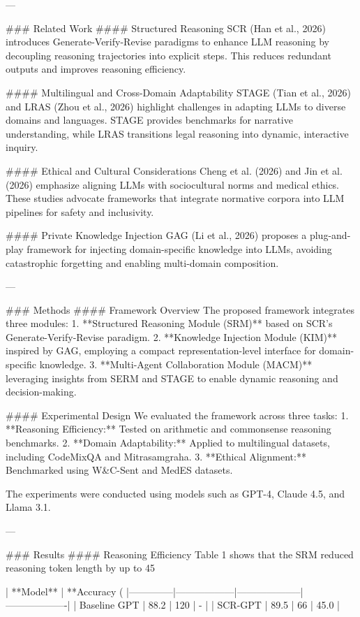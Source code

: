 ---

### Related Work  
#### Structured Reasoning  
SCR (Han et al., 2026) introduces Generate-Verify-Revise paradigms to enhance LLM reasoning by decoupling reasoning trajectories into explicit steps. This reduces redundant outputs and improves reasoning efficiency.

#### Multilingual and Cross-Domain Adaptability  
STAGE (Tian et al., 2026) and LRAS (Zhou et al., 2026) highlight challenges in adapting LLMs to diverse domains and languages. STAGE provides benchmarks for narrative understanding, while LRAS transitions legal reasoning into dynamic, interactive inquiry.

#### Ethical and Cultural Considerations  
Cheng et al. (2026) and Jin et al. (2026) emphasize aligning LLMs with sociocultural norms and medical ethics. These studies advocate frameworks that integrate normative corpora into LLM pipelines for safety and inclusivity.

#### Private Knowledge Injection  
GAG (Li et al., 2026) proposes a plug-and-play framework for injecting domain-specific knowledge into LLMs, avoiding catastrophic forgetting and enabling multi-domain composition.

---

### Methods  
#### Framework Overview  
The proposed framework integrates three modules:  
1. **Structured Reasoning Module (SRM)** based on SCR's Generate-Verify-Revise paradigm.  
2. **Knowledge Injection Module (KIM)** inspired by GAG, employing a compact representation-level interface for domain-specific knowledge.  
3. **Multi-Agent Collaboration Module (MACM)** leveraging insights from SERM and STAGE to enable dynamic reasoning and decision-making.

#### Experimental Design  
We evaluated the framework across three tasks:  
1. **Reasoning Efficiency:** Tested on arithmetic and commonsense reasoning benchmarks.  
2. **Domain Adaptability:** Applied to multilingual datasets, including CodeMixQA and Mitrasamgraha.  
3. **Ethical Alignment:** Benchmarked using W&C-Sent and MedES datasets.

The experiments were conducted using models such as GPT-4, Claude 4.5, and Llama 3.1.

---

### Results  
#### Reasoning Efficiency  
Table 1 shows that the SRM reduced reasoning token length by up to 45%

| **Model**    | **Accuracy (%
|--------------|------------------|--------------------|-------------------|  
| Baseline GPT | 88.2             | 120                | -                 |  
| SCR-GPT      | 89.5             | 66                 | 45.0              |  

